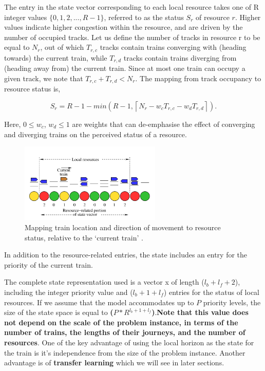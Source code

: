 \vspace{\baselineskip}
The entry in the state vector corresponding to each local
resource takes one of R integer values $ \{0, 1, 2,..., R-1\} $,
referred to as the status $S_r$ of resource $r$. Higher values
indicate higher congestion within the resource, and are driven
by the number of occupied tracks.
Let us define the number
of tracks in resource r to be equal to $N_r$, out of which $T_{r,c}$
tracks contain trains converging with (heading towards) the
current train, while $T_{r,d}$ tracks contain trains diverging from
(heading away from) the current train. Since at most one train
can occupy a given track, we note that $T_{r,c} + T_{r,d} < N_r$. The
mapping from track occupancy to resource status is,

$$ S_r = R - 1 - min(R - 1, \left \lceil{N_r - w_c T_{r,c} - w_d T_{r,d} }\right \rceil ).$$

Here, $0 \leq w_c$, $w_d \leq 1$ are weights that can de-emphasise
the effect of converging and diverging trains on the perceived
status of a resource.
\begin{figure}[h]
  \centering
  \includegraphics[width=0.6\textwidth]{report2}
  \caption{ Mapping train location and direction of movement to resource
  status, relative to the ‘current train’ \cite{ARTICLE:1}.  }
  \label{image-myimage}
\end{figure}

\vspace{\baselineskip}
In addition to the resource-related entries, the state includes
an entry for the priority of the current train.

\vspace{\baselineskip}
The complete state representation
used is a vector x of length ($l_b + l_f + 2$), including
the integer priority value and ($l_b + 1 + l_f$) entries for the status
of local resources. If we assume that the model accommodates
up to $P$ priority levels, the size of the state space is equal to
\textbf{($P * R^{l_b + 1 + l_f}$)}.\textbf{Note that this value does not depend on the
scale of the problem instance, in terms of the number of trains,
the lengths of their journeys, and the number of resources}.
One of the key advantage of using the local horizon as the state for the train is it's independence 
from the size of the problem instance. Another advantage is of \textbf{transfer learning} which we will see in later
sections.


